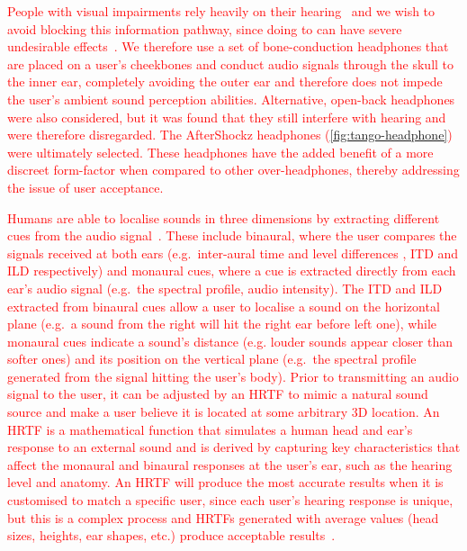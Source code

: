 \documentclass[acmsmall]{acmart}
\newcommand\hl[1]{\textcolor{red}{#1}}
\begin{document}
\hl{People with visual impairments rely heavily on their hearing~\citep{golledge2004stated} and we wish to avoid blocking this information pathway, since doing to can have severe undesirable effects~\citep{lichtenstein2012headphone}.
We therefore use a set of bone-conduction headphones that are placed on a user's cheekbones and conduct audio signals through the skull to the inner ear, completely avoiding the outer ear and therefore does not impede the user's ambient sound perception abilities. 
Alternative, open-back headphones were also considered, but it was found that they still interfere with hearing and were therefore disregarded.
The AfterShockz headphones (\cref{fig:tango-headphone}) were ultimately selected.
These headphones have the added benefit of a more discreet form-factor when compared to other over-headphones, thereby addressing the issue of user acceptance.}


\hl{Humans are able to localise sounds in three dimensions by extracting different cues from the audio signal~\citep{blauert1969sound,blauert1997spatial}.
These include binaural, where the user compares the signals received at both ears (e.g.\ inter-aural time and level differences , ITD and ILD respectively) and monaural cues, where a cue is extracted directly from each ear's audio signal (e.g.\ the spectral profile, audio intensity).
The ITD and ILD extracted from binaural cues allow a user to localise a sound on the horizontal plane (e.g.\ a sound from the right will hit the right ear before left one), while monaural cues indicate a sound's distance (e.g. louder sounds appear closer than softer ones) and its position on the vertical plane (e.g.\ the spectral profile generated from the signal hitting the user's body).
Prior to transmitting an audio signal to the user, it can be adjusted by an HRTF to mimic a natural sound source and make a user believe it is located at some arbitrary 3D location. 
An HRTF is a mathematical function that simulates a human head and ear's response to an external sound and is derived by capturing key characteristics that affect the monaural and binaural responses at the user's ear, such as the hearing level and anatomy. 
An HRTF will produce the most accurate results when it is customised to match a specific user, since each user's hearing response is unique, but this is a complex process and HRTFs generated with average values (head sizes, heights, ear shapes, etc.) produce acceptable results~\citep{gardner1995hrtf}.}
\end{document}
